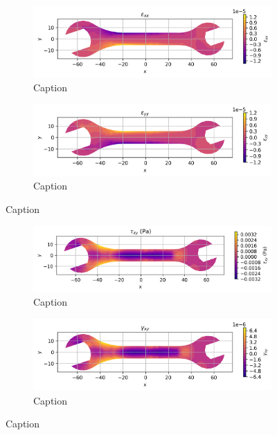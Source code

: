 \documentclass{article}  %
\begin{document}
\begin{figure}
  \centering
  \begin{subfigure}[t]{0.49\textwidth}
    \centering
    \includegraphics[width=\textwidth]{GRAFICOS/Case d - epsilon_xx.png}
    \caption{Caption}
    \label{fig:deformada_reacciones}
  \end{subfigure}
  \hfill
  \begin{subfigure}[t]{0.49\textwidth}
    \centering
    \includegraphics[width=\textwidth]{GRAFICOS/Case d - epsilon_yy.png}
    \caption{Caption}
    \label{fig:von_mises}
  \end{subfigure}
  \caption{Caption}
  \label{fig:analisis_estructural}
\end{figure}

\begin{figure}
  \centering
  \begin{subfigure}[t]{0.49\textwidth}
    \centering
    \includegraphics[width=\textwidth]{GRAFICOS/Case d - tau_xy.png}
    \caption{Caption}
    \label{fig:deformada_reacciones}
  \end{subfigure}
  \hfill
  \begin{subfigure}[t]{0.49\textwidth}
    \centering
    \includegraphics[width=\textwidth]{GRAFICOS/Case d - gamma_xy.png}
    \caption{Caption}
    \label{fig:von_mises}
  \end{subfigure}
  \caption{Caption}
  \label{fig:analisis_estructural}
\end{figure}
\end{document}
